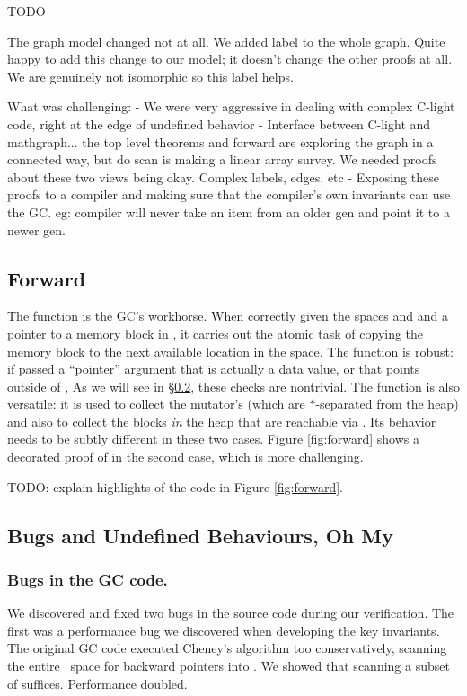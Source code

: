 \hide
{\color{red} TODO

The graph model changed not at all. We added label to the whole graph. Quite happy to add this change to our model; it doesn't change the other proofs at all. We are genuinely not isomorphic so this label helps.

What was challenging:
	- We were very aggressive in dealing with complex C-light code, right at the edge of undefined behavior
	- Interface between C-light and mathgraph... the top level theorems and forward are exploring the graph in a connected way, but do scan is making a linear array survey. We needed proofs about these two views being okay. Complex labels, edges, etc
	- Exposing these proofs to a compiler and making sure that the compiler's own invariants can use the GC. eg: compiler will never take an item from an older gen and point it to a newer gen.
}

\subsection{Forward}
\label{sec:gcforward}
The function  is the GC's workhorse.
When correctly given the spaces  and  and a pointer
 to a memory block in ,
it carries out the atomic task of copying the memory block to the next
available location in the  space.
The function is robust: if passed a ``pointer'' argument
that is actually a data value, or that points outside of
, 
As we will see in \S\ref{sec:gcissues}, these checks are nontrivial.
The function is also versatile: it is used to collect the
mutator's  (which are $*$-separated from the heap)
and also to collect the blocks \emph{in} the heap that are reachable via
. Its behavior needs to be subtly different in these
two cases.
Figure \ref{fig:forward} shows a decorated proof of 
in the second case, which is more challenging.

TODO: explain highlights of the code in Figure \ref{fig:forward}.



\subsection{Bugs and Undefined Behaviours, Oh My} \label{sec:gcissues}

\subsubsection*{Bugs in the GC code.}
We discovered and fixed two bugs in the source code during our verification.
The first was a performance bug we discovered when developing the key invariants.
The original GC code executed Cheney's algorithm too conservatively,
scanning the entire~ space for backward pointers into . We
showed that scanning a subset of  suffices.  Performance doubled.

